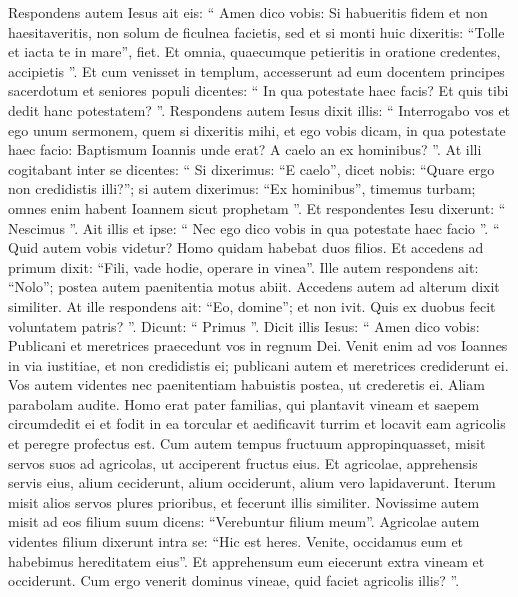 \begin{biblechapter}
\begin{biblechapter}
\begin{biblechapter}
\begin{biblechapter}
\begin{biblechapter}
\begin{biblechapter}
\begin{biblechapter}
\begin{biblechapter}
\begin{biblechapter}
\begin{biblechapter}
\begin{biblechapter}
\begin{biblechapter}
\begin{biblechapter}
\begin{biblechapter}
\begin{biblechapter}
\begin{biblechapter}
\begin{biblechapter}
\begin{biblechapter}
\begin{biblechapter}
\begin{biblechapter}
\begin{biblechapter}
\verse Respondens autem Iesus ait eis: “ Amen dico vobis: Si habueritis fidem et non haesitaveritis, non solum de ficulnea facietis, sed et si monti huic dixeritis: “Tolle et iacta te in mare”, fiet. 
 \verse Et omnia, quaecumque petieritis in oratione credentes, accipietis ”.
 \verse Et cum venisset in templum, accesserunt ad eum docentem principes sacerdotum et seniores populi dicentes: “ In qua potestate haec facis? Et quis tibi dedit hanc potestatem? ”. 
\verse Respondens autem Iesus dixit illis: “ Interrogabo vos et ego unum sermonem, quem si dixeritis mihi, et ego vobis dicam, in qua potestate haec facio: 
\verse Baptismum Ioannis unde erat? A caelo an ex hominibus? ”. At illi cogitabant inter se dicentes: “ Si dixerimus: “E caelo”, dicet nobis: “Quare ergo non credidistis illi?”; 
\verse si autem dixerimus: “Ex hominibus”, timemus turbam; omnes enim habent Ioannem sicut prophetam ”. 
\verse Et respondentes Iesu dixerunt: “ Nescimus ”. Ait illis et ipse: “ Nec ego dico vobis in qua potestate haec facio ”.
 \verse “ Quid autem vobis videtur? Homo quidam habebat duos filios. Et accedens ad primum dixit: “Fili, vade hodie, operare in vinea”. 
\verse Ille autem respondens ait: “Nolo”; postea autem paenitentia motus abiit. 
\verse Accedens autem ad alterum dixit similiter. At ille respondens ait: “Eo, domine”; et non ivit. 
\verse Quis ex duobus fecit voluntatem patris? ”. Dicunt: “ Primus ”. Dicit illis Iesus: “ Amen dico vobis: Publicani et meretrices praecedunt vos in regnum Dei. 
\verse Venit enim ad vos Ioannes in via iustitiae, et non credidistis ei; publicani autem et meretrices crediderunt ei. Vos autem videntes nec paenitentiam habuistis postea, ut crederetis ei.
 \verse Aliam parabolam audite. Homo erat pater familias, qui plantavit vineam et saepem circumdedit ei et fodit in ea torcular et aedificavit turrim et locavit eam agricolis et peregre profectus est. 
\verse Cum autem tempus fructuum appropinquasset, misit servos suos ad agricolas, ut acciperent fructus eius. 
 \verse Et agricolae, apprehensis servis eius, alium ceciderunt, alium occiderunt, alium vero lapidaverunt. 
\verse Iterum misit alios servos plures prioribus, et fecerunt illis similiter. 
\verse Novissime autem misit ad eos filium suum dicens: “Verebuntur filium meum”. 
\verse Agricolae autem videntes filium dixerunt intra se: “Hic est heres. Venite, occidamus eum et habebimus hereditatem eius”. 
\verse Et apprehensum eum eiecerunt extra vineam et occiderunt. 
\verse Cum ergo venerit dominus vineae, quid faciet agricolis illis? ”. 

\end{biblechapter}
\end{biblechapter}
\end{biblechapter}
\end{biblechapter}
\end{biblechapter}
\end{biblechapter}
\end{biblechapter}
\end{biblechapter}
\end{biblechapter}
\end{biblechapter}
\end{biblechapter}
\end{biblechapter}
\end{biblechapter}
\end{biblechapter}
\end{biblechapter}
\end{biblechapter}
\end{biblechapter}
\end{biblechapter}
\end{biblechapter}
\end{biblechapter}
\end{biblechapter}
